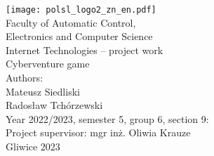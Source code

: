 
\thispagestyle{empty}

\begin{titlepage}
    {\centering
        \null
        \vspace{-1.0in}
        \texttt{[image: polsl\_logo2\_zn\_en.pdf]}\\[2.5em]
        \normalfont\LARGE
        Faculty of Automatic Control, \\Electronics and Computer Science \\[1.3em]
        \normalfont\LARGE
        Internet Technologies -- project work \\[1.5em]
        \UseLMSSBoldFont\LARGE
        Cyberventure game\\[5.2em]}
    \normalfont\large
    \noindent
    Authors:
    \\[0.5em]
    Mateusz Siedliski\\
    Radosław Tchórzewski
    \\[1.5em]
    Year 2022/2023, semester 5, group 6, section 9:
    \\[0.5em]
    Project supervisor: mgr inż. Oliwia Krauze
    \\[1.5em]

    \vfill
    \centering Gliwice 2023
    \par
\end{titlepage}




\pagestyle{plain}






\tableofcontents



